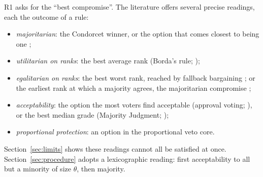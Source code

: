 R1 asks for the ``best compromise''. The literature offers several precise readings, each the
outcome of a rule:
\begin{itemize}
  \item \emph{majoritarian}: the Condorcet winner, or the option that comes closest to being one
  \citep{Young1988,Schulze2011};
  \item \emph{utilitarian on ranks}: the best average rank (Borda's rule; \citealp{Young1974});
  \item \emph{egalitarian on ranks}: the best worst rank, reached by fallback bargaining
  \citep{BramsKilgour2001}; or the earliest rank at which a majority agrees, the majoritarian compromise
  \citep{SertelYilmaz1999};
  \item \emph{acceptability}: the option the most voters find acceptable (approval voting;
  \citealp{BramsFishburn1978}), or the best median grade (Majority Judgment;
  \citealp{BalinskiLaraki2007});
  \item \emph{proportional protection}: an option in the proportional veto core.
\end{itemize}
Section~\ref{sec:limits} shows these readings cannot all be satisfied at once. Section~\ref{sec:procedure}
adopts a lexicographic reading: first acceptability to all but a minority of size $\theta$, then
majority.
